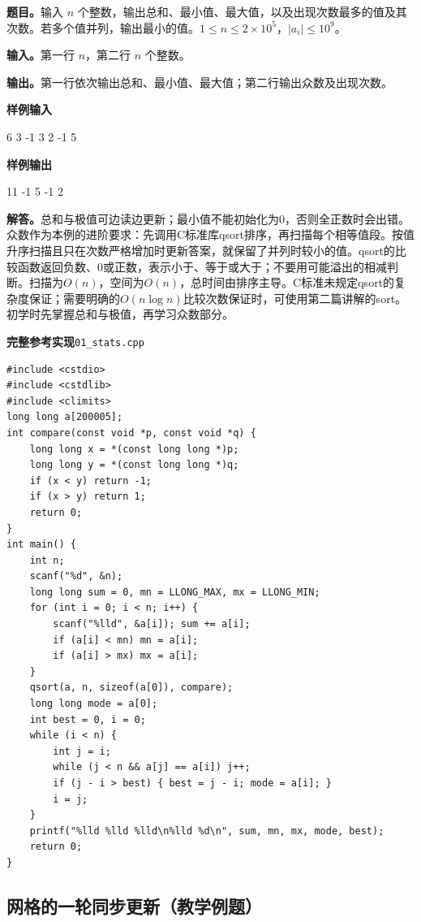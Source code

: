\documentclass[UTF8,11pt,a4paper,fontset=none]{ctexart}
\begin{document}
\noindent\textbf{题目。}输入 $n$ 个整数，输出总和、最小值、最大值，以及出现次数最多的值及其次数。若多个值并列，输出最小的值。$1\le n\le2\times10^5$，$|a_i|\le10^9$。

\noindent\textbf{输入。}第一行 $n$，第二行 $n$ 个整数。

\noindent\textbf{输出。}第一行依次输出总和、最小值、最大值；第二行输出众数及出现次数。
\begin{tcolorbox}[samplebox,title={输入输出样例}]
\textbf{样例输入}
\begin{Sample}
6
3 -1 3 2 -1 5
\end{Sample}
\tcblower
\textbf{样例输出}
\begin{Sample}
11 -1 5
-1 2
\end{Sample}
\end{tcolorbox}

\noindent\textbf{解答。}总和与极值可边读边更新；最小值不能初始化为0，否则全正数时会出错。众数作为本例的进阶要求：先调用C标准库qsort排序，再扫描每个相等值段。按值升序扫描且只在次数严格增加时更新答案，就保留了并列时较小的值。qsort的比较函数返回负数、0或正数，表示小于、等于或大于；不要用可能溢出的相减判断。扫描为$O(n)$，空间为$O(n)$，总时间由排序主导。C标准未规定qsort的复杂度保证；需要明确的$O(n\log n)$比较次数保证时，可使用第二篇讲解的sort。初学时先掌握总和与极值，再学习众数部分。
\par\noindent\begin{minipage}{\linewidth}
\textbf{完整参考实现}\quad\texttt{01\_stats.cpp}
\begin{lstlisting}
#include <cstdio>
#include <cstdlib>
#include <climits>
long long a[200005];
int compare(const void *p, const void *q) {
    long long x = *(const long long *)p;
    long long y = *(const long long *)q;
    if (x < y) return -1;
    if (x > y) return 1;
    return 0;
}
int main() {
    int n;
    scanf("%d", &n);
    long long sum = 0, mn = LLONG_MAX, mx = LLONG_MIN;
    for (int i = 0; i < n; i++) {
        scanf("%lld", &a[i]); sum += a[i];
        if (a[i] < mn) mn = a[i];
        if (a[i] > mx) mx = a[i];
    }
    qsort(a, n, sizeof(a[0]), compare);
    long long mode = a[0];
    int best = 0, i = 0;
    while (i < n) {
        int j = i;
        while (j < n && a[j] == a[i]) j++;
        if (j - i > best) { best = j - i; mode = a[i]; }
        i = j;
    }
    printf("%lld %lld %lld\n%lld %d\n", sum, mn, mx, mode, best);
    return 0;
}
\end{lstlisting}
\end{minipage}\par
\subsection{网格的一轮同步更新（教学例题）}
\end{document}

